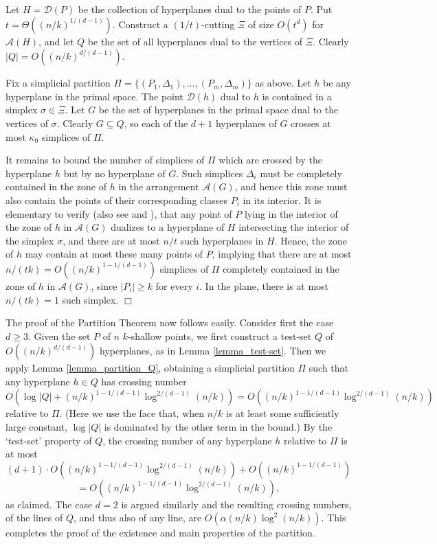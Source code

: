 \documentclass[11pt]{article}
\begin{document}
 Let $H = \mathcal{D}(P)$ be the collection of hyperplanes dual to the points of $P$. Put $t = \Theta((n/k)^{1/(d-1)})$. Construct a $(1/t)$-cutting $\Xi$ of size $O(t^{d})$ for $\mathcal{A}(H)$, and let $Q$ be the set of all hyperplanes dual to the vertices of $\Xi$. Clearly $|Q| = O((n/k)^{d/(d-1)})$.

Fix a simplicial partition $\Pi = \{(P_{1},\Delta_{1}), \ldots, (P_{m},\Delta_{m})\}$ as above.
Let $h$ be any hyperplane in the primal space. The point $\mathcal{D}(h)$ dual to $h$ is contained in a simplex $\sigma \in \Xi$. Let $G$ be the set of hyperplanes in the primal space dual to the vertices of $\sigma$. Clearly $G \subseteq Q$, so each of the $d+1$ hyperplanes of $G$ crosses at most $\kappa_{0}$ simplices of $\Pi$.

It remains to bound the number of simplices of $\Pi$ which are crossed by the hyperplane $h$ but by no hyperplane of $G$. Such simplices $\Delta_{i}$ must be completely contained in the zone of $h$ in the arrangement $\mathcal{A}(G)$, and hence this zone must also contain the points of their corresponding classes $P_{i}$ in its interior. It is elementary to verify (also see \cite{mat92a} and \cite{mat92b}), that any point of $P$ lying in the interior of the zone of $h$ in $\mathcal{A}(G)$ dualizes to a hyperplane of $H$ intersecting the interior of the simplex $\sigma$, and there are at most $n/t$ such hyperplanes in $H$. Hence, the zone of $h$ may contain at most these many points of $P$, implying that there are at most $n/(tk) = O((n/k)^{1-1/(d-1)})$ simplices of $\Pi$ completely contained in the zone of $h$ in $\mathcal{A}(G)$, since $\left| P_{i} \right| \geq k$ for every $i$. In the plane, there is at most $n/(tk) = 1$ such simplex. $\Box$


 The proof of the Partition Theorem now follows easily. Consider first the case $d \geq 3$. Given the set $P$ of $n$ $k$-shallow points, we first construct a test-set $Q$ of $O((n/k)^{d/(d-1)})$ hyperplanes, as in Lemma \ref{lemma_test-set}. Then we apply Lemma \ref{lemma_partition_Q}, obtaining a simplicial partition $\Pi$ such that any hyperplane $h \in Q$ has crossing number
$$
O\left(\log |Q| + (n/k)^{1 - 1/(d-1)} \log^{2/(d-1)}(n/k)\right) = O\left((n/k)^{1 - 1/(d-1)} \log^{2/(d-1)}(n/k)\right)
$$
relative to $\Pi$. (Here we use the face that, when $n/k$ is at least some sufficiently large constant, $\log|Q|$ is dominated by the other term in the bound.) By the `test-set' property of $Q$, the crossing number of any hyperplane $h$ relative to $\Pi$ is at most
$$
(d+1) \cdot O\left((n/k)^{1 - 1/(d-1)} \log^{2/(d-1)}(n/k)\right) + O\left((n/k)^{1-1/(d-1)} \right)
$$
$$
= O\left((n/k)^{1-1/(d-1)} \log^{2/(d-1)}(n/k)\right),
$$
as claimed. The case $d = 2$ is argued similarly and the resulting crossing numbers, of the lines of $Q$, and thus also of any line, are $O(\alpha(n/k) \log^{2}(n/k))$. This completes the proof of the existence and main properties of the partition.
\end{document}
